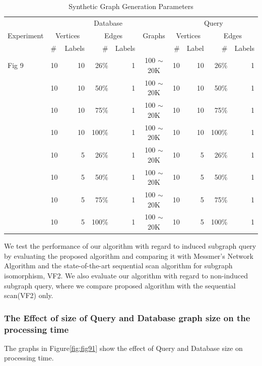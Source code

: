 \begin{table}
\begin{center}
\begin{tabular}{|l|l|r|r|r|c|r|r|r|r|}  \hline
\multirow{3}{*}{Experiment} & \multicolumn{5}{c|}{Database} & \multicolumn{4}{c|}{Query}  \\ \cline{2-2} \cline{3-3} \cline{4-4} \cline{5-5} \cline{6-6} \cline{7-7} \cline{8-8} \cline{9-9} \cline{10-10}
       & \multicolumn{2}{c|}{Vertices} & \multicolumn{2}{c|}{Edges} & Graphs & \multicolumn{2}{c|}{Vertices} & \multicolumn{2}{c|}{Edges} \\ \cline{2-2} \cline{3-3} \cline{4-4} \cline{5-5}  \cline{7-7} \cline{8-8} \cline{9-9} \cline{10-10} 
 & \#  & Labels & \# & Labels &  & \#  & Label & \# & Labels  \\ \hline
Fig 9 & 10 & 10 & 26\% & 1 & 100 $\sim$ 20K & 10 & 10 & 26\% & 1 \\ \hline
  & 10 & 10 & 50\% & 1 & 100 $\sim$ 20K & 10 & 10 & 50\% & 1 \\ \hline
 & 10 & 10 & 75\% & 1 & 100 $\sim$ 20K & 10 & 10 & 75\% & 1 \\ \hline
 & 10 & 10 & 100\% & 1 & 100 $\sim$  20K & 10 & 10 & 100\% & 1 \\ \hline
 & 10 & 5 & 26\% & 1 & 100 $\sim$  20K & 10 & 5 & 26\% & 1 \\ \hline
 & 10 & 5 & 50\% & 1 & 100 $\sim$  20K & 10 & 5 & 50\% & 1 \\ \hline
 & 10 & 5 & 75\% & 1 & 100 $\sim$  20K & 10 & 5 & 75\% & 1 \\ \hline
 & 10 & 5 & 100\% & 1 & 100 $\sim$ 20K & 10 & 5 & 100\% & 1 \\ \hline
\end{tabular}
\caption{ Synthetic Graph Generation Parameters \label{tab:parameterTable} }
\end{center}
\end{table}


We test the performance of our algorithm with regard to induced subgraph query by evaluating the proposed algorithm and comparing it with Messmer's Network Algorithm and the state-of-the-art sequential scan algorithm for subgraph isomorphism, VF2\cite{cordella2001_vf2}. We also evaluate our algorithm with regard to non-induced subgraph query, where we compare proposed algorithm with the sequential scan(VF2) only.


\subsubsection{The Effect of size of Query and Database graph size on  the processing time}
The graphs in Figure\ref{fig:fig91} show the effect of Query and Database size on processing time.  


